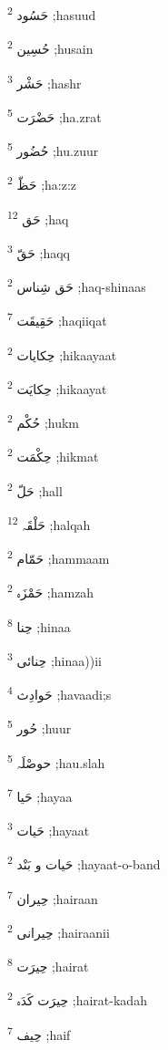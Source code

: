 \documentclass[12pt]{article}
\begin{document}
\begin{RTL}
\begin{multicols}{5}
{\ur حَسُود}   \textsuperscript{2} ;hasuud

{\ur حُسِین}   \textsuperscript{2} ;husain

{\ur حَشْر}   \textsuperscript{3} ;hashr

{\ur حَضْرَت}   \textsuperscript{5} ;ha.zrat

{\ur حُضُور}   \textsuperscript{5} ;hu.zuur

{\ur حَظّ}   \textsuperscript{2} ;ha:z:z

{\ur حَق}   \textsuperscript{12} ;haq

{\ur حَقّ}   \textsuperscript{3} ;haqq

{\ur حَق شِناس}   \textsuperscript{2} ;haq-shinaas

{\ur حَقِیقَت}   \textsuperscript{7} ;haqiiqat

{\ur حِکایات}   \textsuperscript{2} ;hikaayaat

{\ur حِکایَت}   \textsuperscript{2} ;hikaayat

{\ur حُکْم}   \textsuperscript{2} ;hukm

{\ur حِکْمَت}   \textsuperscript{2} ;hikmat

{\ur حَلّ}   \textsuperscript{2} ;hall

{\ur حَلْقَہ}   \textsuperscript{12} ;halqah

{\ur حَمّام}   \textsuperscript{2} ;hammaam

{\ur حَمْزَہ}   \textsuperscript{2} ;hamzah

{\ur حِنا}   \textsuperscript{8} ;hinaa

{\ur حِنائی}   \textsuperscript{3} ;hinaa))ii

{\ur حَوادِث}   \textsuperscript{4} ;havaadi;s

{\ur حُور}   \textsuperscript{5} ;huur

{\ur حوصْلَہ}   \textsuperscript{5} ;hau.slah

{\ur حَیا}   \textsuperscript{7} ;hayaa

{\ur حَیات}   \textsuperscript{3} ;hayaat

{\ur حَیات و بَنْد}   \textsuperscript{2} ;hayaat-o-band

{\ur حِیران}   \textsuperscript{7} ;hairaan

{\ur حِیرانی}   \textsuperscript{2} ;hairaanii

{\ur حِیرَت}   \textsuperscript{8} ;hairat

{\ur حِیرَت کَدَہ}   \textsuperscript{2} ;hairat-kadah

{\ur حِیف}   \textsuperscript{7} ;haif


\end{multicols}
\end{RTL}
\end{document}
